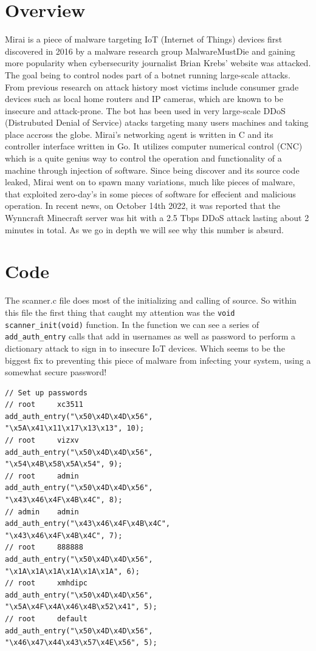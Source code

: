 \documentclass[12pt, letterpaper]{article}
\begin{document}
\begin{sloppypar}


\begin{flushleft}
\section{Overview}
Mirai is a piece of malware targeting IoT (Internet of Things) devices first discovered 
in 2016 by a malware research group MalwareMustDie and gaining more popularity when 
cybersecurity journalist Brian Krebs' website was attacked. The goal being to 
control nodes part of a botnet running large-scale attacks. From previous research on 
attack history most victims include consumer grade devices such as local home routers 
and IP cameras, which are known to be insecure and attack-prone. The bot has been used 
in very large-scale DDoS (Distrubuted Denial of Service) atacks targeting many users 
machines and taking place accross the globe. Mirai's networking agent is written in C 
and its controller interface written in Go. It utilizes computer numerical control (CNC) 
which is a quite genius way to control the operation and functionality of a machine 
through injection of software. Since being discover and its source code leaked, Mirai 
went on to spawn many variations, much like pieces of malware, that exploited zero-day's 
in some pieces of software for effecient and malicious operation. In recent news, on
October 14th 2022, it was reported that the Wynncraft Minecraft server was hit with
a 2.5 Tbps DDoS attack lasting about 2 minutes in total. As we go in depth we will see
why this number is absurd. 

\newpage

\section{Code}
The scanner.c file does most of the initializing and calling of source. So within this
file the first thing that caught my attention was the \verb|void scanner_init(void)| 
function. In the function we can see a series of \verb|add_auth_entry| calls that add 
in usernames as well as password to perform a dictionary attack to sign in to insecure
IoT devices. Which seems to be the biggest fix to preventing this piece of malware from
infecting your system, using a somewhat secure password!

\begin{lstlisting}
// Set up passwords
// root     xc3511
add_auth_entry("\x50\x4D\x4D\x56", 
"\x5A\x41\x11\x17\x13\x13", 10);
// root     vizxv
add_auth_entry("\x50\x4D\x4D\x56", 
"\x54\x4B\x58\x5A\x54", 9);
// root     admin
add_auth_entry("\x50\x4D\x4D\x56",
"\x43\x46\x4F\x4B\x4C", 8);
// admin    admin
add_auth_entry("\x43\x46\x4F\x4B\x4C", 
"\x43\x46\x4F\x4B\x4C", 7);
// root     888888
add_auth_entry("\x50\x4D\x4D\x56", 
"\x1A\x1A\x1A\x1A\x1A\x1A", 6);
// root     xmhdipc
add_auth_entry("\x50\x4D\x4D\x56", 
"\x5A\x4F\x4A\x46\x4B\x52\x41", 5);
// root     default
add_auth_entry("\x50\x4D\x4D\x56", 
"\x46\x47\x44\x43\x57\x4E\x56", 5);
\end{lstlisting}


\end{flushleft}
\end{sloppypar}
\end{document}
